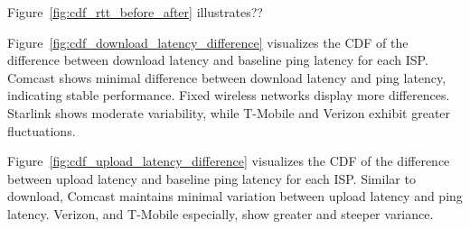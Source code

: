 Figure~\ref{fig:cdf_rtt_before_after} illustrates?? 

Figure~\ref{fig:cdf_download_latency_difference} visualizes the CDF of the difference 
between download latency and baseline ping latency for each ISP. Comcast shows minimal difference 
between download latency and ping latency, indicating stable performance. Fixed wireless networks 
display more differences. Starlink shows moderate variability, while T-Mobile and Verizon exhibit 
greater fluctuations. 

Figure~\ref{fig:cdf_upload_latency_difference} visualizes the CDF of the difference 
between upload latency and baseline ping latency for each ISP. Similar to download, 
Comcast maintains minimal variation between upload latency and ping latency. 
Verizon, and T-Mobile especially, show greater and steeper variance. 